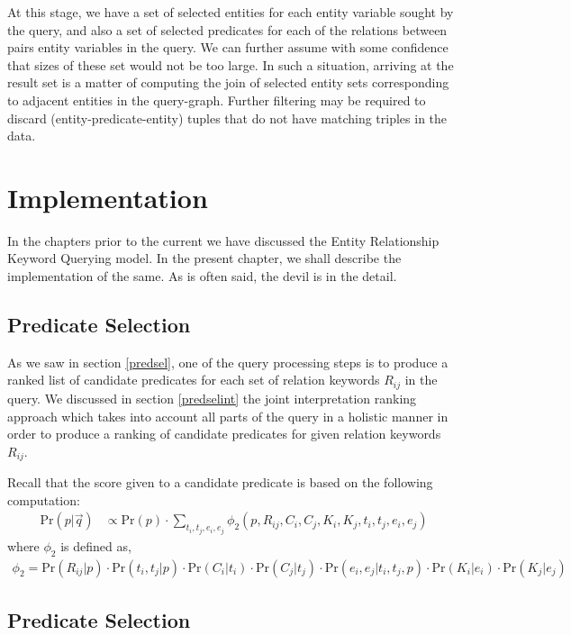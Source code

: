 \documentclass[a4paper, twoside, 12pt]{report}
\begin{document}
At this stage, we have a set of selected entities for each entity variable sought by the query, and also a set of selected predicates for each of the relations between pairs entity variables in the query. We can further assume with some confidence that sizes of these set would not be too large. In such a situation, arriving at the result set is a matter of computing the join of selected entity sets corresponding  to adjacent entities in the query-graph. Further filtering may be required to discard (entity-predicate-entity) tuples that do not have matching triples in the data.



\chapter{Implementation}

In the chapters prior to the current we have discussed the Entity Relationship Keyword Querying model. In the present chapter, we shall describe the implementation of the same. As is often said, the devil is in the detail.

\section{Predicate Selection}
As we saw in section \ref{predsel}, one of the query processing steps is to produce a ranked list of candidate predicates for each set of relation keywords $R_{ij}$ in the query. We discussed in section \ref{predselint} the joint interpretation ranking approach which takes into account all parts of the query in a holistic manner in order to produce a ranking of candidate predicates for given relation keywords $R_{ij}$.

Recall that the score given to a candidate predicate is based on the following computation:
\begin{align}
\text{Pr}(p|\vec{q})& \propto \text{Pr}(p) \cdot \sum_{t_i,t_j,e_i,e_j} \phi_2(p, R_{ij}, C_i, C_j, K_i, K_j, t_i, t_j, e_i, e_j) \label{eq:main3}
\end{align}
where $\phi_2$ is defined as,
\begin{align}
\phi_2 = \text{Pr}(R_{ij}|p) \cdot \text{Pr}(t_i,t_j|p) \cdot \text{Pr}(C_i|t_i) \cdot \text{Pr}(C_j|t_j) \cdot \text{Pr}(e_i,e_j|t_i,t_j,p) \cdot \text{Pr}(K_i|e_i) \cdot \text{Pr}(K_j|e_j) \label{eq:phi2}
\end{align}

\section{Predicate Selection}
\end{document}
